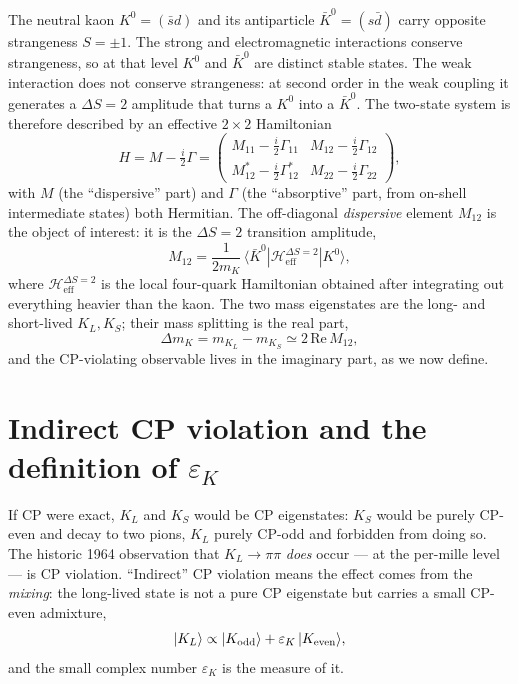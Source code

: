\documentclass[11pt]{article}
\newcommand{\epsK}{\varepsilon_K}
\newcommand{\Mtwelve}{M_{12}}
\newcommand{\dmk}{\Delta m_K}
\theoremstyle{definition}
\begin{document}
The neutral kaon $K^0 = (\bar s d)$ and its antiparticle $\bar K^0 = (s\bar d)$
carry opposite strangeness $S=\pm1$. The strong and electromagnetic interactions
conserve strangeness, so at that level $K^0$ and $\bar K^0$ are distinct stable
states. The weak interaction does not conserve strangeness: at second order in
the weak coupling it generates a $\Delta S=2$ amplitude that turns a $K^0$ into a
$\bar K^0$. The two-state system is therefore described by an effective
$2\times2$ Hamiltonian
\begin{equation}
H = M - \tfrac{i}{2}\Gamma
= \begin{pmatrix} M_{11} - \tfrac{i}{2}\Gamma_{11} & \Mtwelve - \tfrac{i}{2}\Gamma_{12} \\[2pt]
\Mtwelve^* - \tfrac{i}{2}\Gamma_{12}^* & M_{22} - \tfrac{i}{2}\Gamma_{22} \end{pmatrix},
\label{eq:Heff2x2}
\end{equation}
with $M$ (the ``dispersive'' part) and $\Gamma$ (the ``absorptive'' part, from
on-shell intermediate states) both Hermitian. The off-diagonal
\emph{dispersive} element $\Mtwelve$ is the object of interest: it is the
$\Delta S=2$ transition amplitude,
\begin{equation}
\Mtwelve = \frac{1}{2 m_K}\,\langle \bar K^0 | \mathcal{H}_{\mathrm{eff}}^{\Delta S=2} | K^0 \rangle ,
\label{eq:M12def}
\end{equation}
where $\mathcal{H}_{\mathrm{eff}}^{\Delta S=2}$ is the local four-quark
Hamiltonian obtained after integrating out everything heavier than the kaon. The
two mass eigenstates are the long- and short-lived $K_L, K_S$; their mass
splitting is the real part,
\begin{equation}
\dmk = m_{K_L} - m_{K_S} \simeq 2\,\mathrm{Re}\,\Mtwelve ,
\end{equation}
and the CP-violating observable lives in the imaginary part, as we now define.

\section{Indirect CP violation and the definition of $\varepsilon_K$}
\label{sec:epsdef}

If CP were exact, $K_L$ and $K_S$ would be CP eigenstates: $K_S$ would be purely
CP-even and decay to two pions, $K_L$ purely CP-odd and forbidden from doing so.
The historic 1964 observation that $K_L \to \pi\pi$ \emph{does} occur --- at the
per-mille level --- is CP violation. ``Indirect'' CP violation means the effect
comes from the \emph{mixing}: the long-lived state is not a pure CP eigenstate but
carries a small CP-even admixture,
\begin{equation}
|K_L\rangle \propto |K_{\rm odd}\rangle + \epsK\,|K_{\rm even}\rangle ,
\end{equation}
and the small complex number $\epsK$ is the measure of it.
\end{document}
